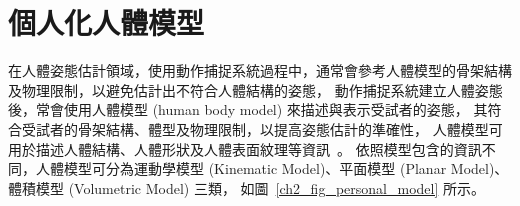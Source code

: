 \section{個人化人體模型}
在人體姿態估計領域，使用動作捕捉系統過程中，通常會參考人體模型的骨架結構及物理限制，以避免估計出不符合人體結構的姿態，
動作捕捉系統建立人體姿態後，常會使用人體模型 (human body model) 來描述與表示受試者的姿態，
其符合受試者的骨架結構、體型及物理限制，以提高姿態估計的準確性，
人體模型可用於描述人體結構、人體形狀及人體表面紋理等資訊~\cite{gong2016human}。
依照模型包含的資訊不同，人體模型可分為運動學模型 (Kinematic Model)、平面模型 (Planar Model)、體積模型 (Volumetric Model) 三類，
如圖~\ref{ch2_fig_personal_model} 所示。

